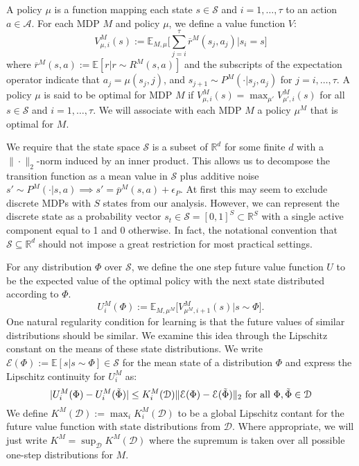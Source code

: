 \documentclass{article}
\newcommand{\Exp}{\mathds{E}}
\newcommand{\Real}{\mathds{R}}
\newcommand{\Sc}{\mathcal{S}}
\newcommand{\Ac}{\mathcal{A}}
\newcommand{\Ec}{\mathcal{E}}
\newcommand{\Dc}{\mathcal{D}}
\begin{document}
A policy $\mu$ is a function mapping each state $s \in \Sc$ and $i = 1,\ldots,\tau$ to an action $a \in \Ac$.
For each MDP $M$ and policy $\mu$, we define a value function $V$:
\begin{equation}
\label{eq: value fn}
V^{M}_{\mu, i}(s) := \Exp_{M,\mu}\big[ \sum_{j=i}^{\tau} \overline{r}^M(s_j,a_j) \Big| s_i = s\big]
\end{equation}
where $\overline{r}^M(s,a) := \Exp[r | r \sim R^M(s,a)]$ and the subscripts of the expectation operator indicate that $a_j = \mu(s_j, j)$, and $s_{j+1} \sim P^M(\cdot| s_j, a_j)$ for $j = i, \ldots, \tau$.  A policy $\mu$ is said to be optimal for MDP $M$ if $V^{M}_{\mu, i}(s) = \max_{\mu'} V^{M}_{\mu', i}(s)$ for all $s \in \Sc$ and $i=1,\ldots,\tau$. We will associate with each MDP $M$ a policy $\mu^M$ that is optimal for $M$.

We require that the state space $\Sc$ is a subset of $\Real^d$ for some finite $d$ with a $\| \cdot \|_2$-norm induced by an inner product.
This allows us to decompose the transition function as a mean value in $\Sc$ plus additive noise $s' \sim P^M(\cdot|s,a) \implies s' = \overline{p}^M(s,a) + \epsilon_P$.
At first this may seem to exclude discrete MDPs with $S$ states from our analysis.
However, we can represent the discrete state as a probability vector $s_t \in \Sc = [0,1]^S \subset \Real^S$ with a single active component equal to 1 and 0 otherwise.
In fact, the notational convention that $\Sc \subseteq \Real^d$ should not impose a great restriction for most practical settings.

For any distribution $\Phi$ over $\Sc$, we define the one step future value function $U$ to be the expected value of the optimal policy with the next state distributed according to $\Phi$.
\begin{equation}
\label{eq: future value}
U^M_{i}(\Phi) := \Exp_{M,\mu^M}\big[ V^M_{\mu^M,i+1}(s) \big| s \sim \Phi \big].
\end{equation}
One natural regularity condition for learning is that the future values of similar distributions should be similar.
We examine this idea through the Lipschitz constant on the means of these state distributions.
We write $\Ec(\Phi) := \Exp[s | s \sim \Phi] \in \Sc$ for the mean state of a distribution $\Phi$ and express the Lipschitz continuity for $U_i^M$ as:
\begin{equation}
\label{eq: future Lipschitz}
| U^M_i(\Phi) - U^M_i(\tilde{\Phi}) | \le K^M_i(\Dc) \| \Ec(\Phi) - \Ec(\tilde{\Phi}) \|_2 {\rm \ for \ all \ } \Phi, \tilde{\Phi} \in \Dc
\end{equation}
We define $K^M(\Dc) := \max_{i} K^M_i(\Dc)$ to be a global Lipschitz contant for the future value function with state distributions from $\Dc$.
Where appropriate, we will just write $K^M = \sup_\Dc K^M(\Dc)$ where the supremum is taken over all possible one-step distributions for $M$.
\end{document}
